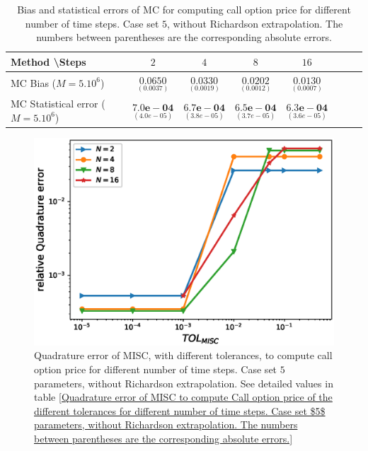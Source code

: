 \FloatBarrier
\begin{table}[h!]
	\centering
	\begin{tabular}{l*{6}{c}r}
		Method \textbackslash  Steps            & $2$ & $4$ & $8$ & $16$  \\
		\hline
		MC Bias ($M=5.10^6$)   & 	$ \underset{(0.0037
			)}{\mathbf{0.0650}}$  & $\underset{(0.0019)}{\mathbf{0.0330
		}}$  & $\underset{(0.0012)}{\mathbf{0.0202}}$ & $\underset{(0.0007)}{\mathbf{0.0130}}$\\ 
		
		MC Statistical error ($M=5.10^6$)  &  $\underset{(   4.0e-05)} {\mathbf{7.0e-04}}$  & $\underset{(3.8e-05)} {\mathbf{6.7e-04}}$  & $\underset{(3.7e-05)} {\mathbf{6.5e-04 }}$ & $\underset{(3.6e-05)} {\mathbf{6.3e-04}}$	\\
		
		\hline
	\end{tabular}
	\caption{Bias and statistical errors of MC   for computing call option price  for different number of time steps. Case set $5$, without Richardson extrapolation. The numbers between parentheses are the corresponding absolute errors.}
	\label{Bias and Statistical errors of MC ($M=5.10^6$)  for computing Call option price  for different number of time steps. Case set 5, without Richardson extrapolation. The numbers between parentheses are the corresponding absolute errors.}
\end{table}
%
%
%


\FloatBarrier





\begin{figure}[h!]
	\centering
	\includegraphics[width=0.4\linewidth]{./figures/rBergomi_MISC_quadratre_error/vs_TOL/set7/relative_quad_error_wrt_MISC_TOL_set7_non_rich}
	
	
	\caption{Quadrature error of MISC, with  different tolerances,  to compute call option price  for different number of time steps. Case  set $5$ parameters, without Richardson extrapolation.  See detailed values  in table \ref{Quadrature error of MISC to compute Call option price of the different tolerances for different number of time steps. Case  set $5$ parameters, without Richardson extrapolation. The numbers between parentheses are the corresponding absolute errors.}}
	\label{fig:Quadrature_error_set5}
\end{figure}

